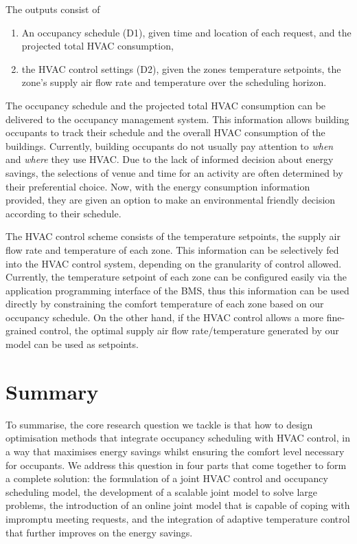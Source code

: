 The outputs consist of
\begin{enumerate}
	\item An occupancy schedule (D1), given time and location of each request, and the projected total HVAC consumption,
	\item the HVAC control settings (D2), given the zones temperature setpoints, the zone's supply air flow rate and temperature over the scheduling horizon.
\end{enumerate}

The occupancy schedule and the projected total HVAC consumption can be delivered to the occupancy management system. This information allows building occupants to track their schedule and the overall HVAC consumption of the buildings. Currently, building occupants do not usually pay attention to \textsl{when} and \textsl{where} they use HVAC. Due to the lack of informed decision about energy savings, the selections of venue and time for an activity are often determined by their preferential choice. Now, with the energy consumption information provided, they are given an option to make an environmental friendly decision according to their schedule. 

The HVAC control scheme consists of the temperature setpoints, the supply air flow rate and temperature of each zone. This information can be selectively fed into the HVAC control system, depending on the granularity of control allowed. Currently, the temperature setpoint of each zone can be configured easily via the application programming interface of the BMS, thus this information can be used directly by constraining the comfort temperature of each zone based on our occupancy schedule. On the other hand, if the HVAC control allows a more fine-grained control, the  optimal supply air flow rate/temperature generated by our model can be used as setpoints.


\section{Summary}
\label{sec:intro_summary}

To summarise, the core research question we tackle is that how to design optimisation methods that integrate occupancy scheduling
with HVAC control, in a way that maximises energy savings whilst ensuring the comfort level necessary for occupants. We address this question in four parts that come together to form a complete solution: the formulation of a joint HVAC control and occupancy scheduling model, the development of a scalable joint model to solve large problems, the introduction of an online joint model that is capable of coping with impromptu meeting requests, and the integration of adaptive temperature control that further improves on the energy savings.

